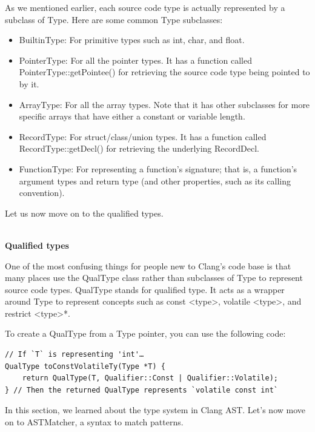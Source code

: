 As we mentioned earlier, each source code type is actually represented by a subclass of Type. Here are some common Type subclasses:

\begin{itemize}
\item BuiltinType: For primitive types such as int, char, and float.

\item PointerType: For all the pointer types. It has a function called PointerType::getPointee() for retrieving the source code type being pointed to by it.

\item ArrayType: For all the array types. Note that it has other subclasses for more specific arrays that have either a constant or variable length.

\item RecordType: For struct/class/union types. It has a function called RecordType::getDecl() for retrieving the underlying RecordDecl.

\item FunctionType: For representing a function's signature; that is, a function's argument types and return type (and other properties, such as its calling convention).

\end{itemize}

Let us now move on to the qualified types.

\hspace*{\fill} \\ %
\noindent
\textbf{Qualified types}

One of the most confusing things for people new to Clang's code base is that many places use the QualType class rather than subclasses of Type to represent source code types. QualType stands for qualified type. It acts as a wrapper around Type to represent concepts such as const <type>, volatile <type>, and restrict <type>*.

To create a QualType from a Type pointer, you can use the following code:

\begin{lstlisting}[style=styleCXX]
// If `T` is representing 'int'…
QualType toConstVolatileTy(Type *T) {
	return QualType(T, Qualifier::Const | Qualifier::Volatile);
} // Then the returned QualType represents `volatile const int`
\end{lstlisting}

In this section, we learned about the type system in Clang AST. Let's now move on to ASTMatcher, a syntax to match patterns.

